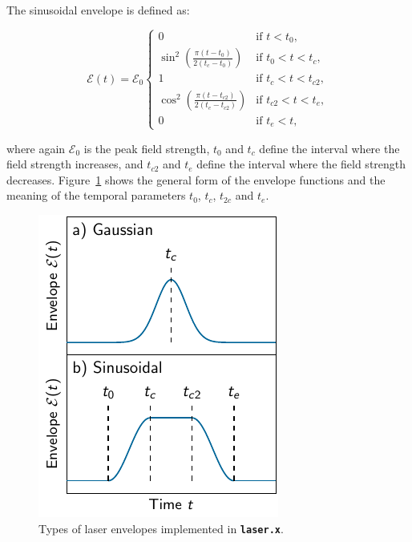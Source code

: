 \documentclass[a4paper,11pt,DIV=15,openany,twoside=false]{scrbook}
\newcommand{\ttmdump}[1]{#1}
\newcommand{\ttt}[1]{\textbf{\texttt{#1}}}
\begin{document}
The sinusoidal envelope is defined as:
\ttmdump{
  \begin{equation}
    \mathcal{E}(t)=\mathcal{E}_0
    \begin{cases}
      0                                                   &\text{if } t<t_0,\\
      \sin^2\left(\frac{\pi(t-t_0)}{2(t_c-t_0)}\right)      &\text{if } t_0<t<t_c,\\
      1                                                   &\text{if } t_c<t<t_{c2},\\
      \cos^2\left(\frac{\pi(t-t_{c2})}{2(t_e-t_{c2})}\right)      &\text{if } t_{c2}<t<t_e,\\
      0                                                   &\text{if } t_e<t,\label{eq:laser_sinus}
    \end{cases}
  \end{equation}
}
where again $\mathcal{E}_0$ is the peak field strength, $t_0$ and $t_c$ define the interval where the field strength increases, and $t_{c2}$ and $t_e$ define the interval where the field strength decreases. Figure~\ref{fig:laser_envelope} shows the general form of the envelope functions and the meaning of the temporal parameters $t_0$, $t_c$, $t_{2c}$ and $t_e$.

\begin{figure}[h!]
  \centering
  \includegraphics[scale=1]{img/laser_envelope/laser_envelope.pdf}
  \caption{Types of laser envelopes implemented in \ttt{laser.x}.}
  \label{fig:laser_envelope}
\end{figure}
\end{document}
